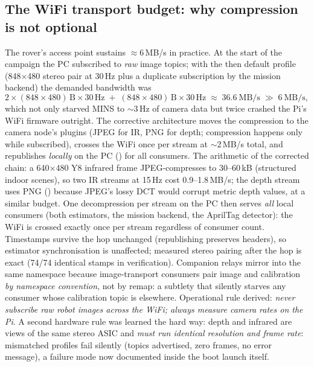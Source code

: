 \subsection{The WiFi transport budget: why compression is not optional}
\label{sec:wifi}
The rover's access point sustains $\approx 6$\,MB/s in practice. At the start
of the campaign the PC subscribed to \emph{raw} image topics; with the then
default profile (848$\times$480 stereo pair at 30\,Hz plus a duplicate
subscription by the mission backend) the demanded bandwidth was
\begin{equation}
2 \times (848{\times}480)\,\text{B} \times 30\,\text{Hz}
\;+\; (848{\times}480)\,\text{B} \times 30\,\text{Hz}
\;\approx\; 36.6\ \text{MB/s} \;\gg\; 6\ \text{MB/s},
\end{equation}
which not only starved MINS to $\sim$3\,Hz of camera data but twice crashed
the Pi's WiFi firmware outright. The corrective architecture moves the
compression to the camera node's  plugins (JPEG for
IR, PNG for depth; compression happens only while subscribed), crosses the
WiFi once per stream at $\sim$2\,MB/s total, and republishes \emph{locally}
on the PC () for all consumers. The arithmetic of the
corrected chain: a 640$\times$480 Y8 infrared frame JPEG-compresses to
30--60\,kB (structured indoor scenes), so two IR streams at 15\,Hz cost
0.9--1.8\,MB/s; the depth stream uses PNG () because
JPEG's lossy DCT would corrupt metric depth values, at a similar budget. One
decompression per stream on the PC then serves \emph{all} local consumers
(both estimators, the mission backend, the AprilTag detector): the WiFi is
crossed exactly once per stream regardless of consumer count. Timestamps
survive the hop unchanged (republishing preserves headers), so estimator
synchronisation is unaffected; measured stereo pairing after the hop is
exact (74/74 identical stamps in verification). Companion relays mirror
 into the same namespace because image-transport consumers
pair image and calibration \emph{by namespace convention}, not by remap:
a subtlety that silently starves any consumer whose calibration topic is
elsewhere. Operational rule derived: \emph{never subscribe raw robot images
across the WiFi; always measure camera rates on the Pi}. A second hardware
rule was learned the hard way: depth and infrared are views of the same
stereo ASIC and \emph{must run identical resolution and frame rate}:
mismatched profiles fail silently (topics advertised, zero frames, no error
message), a failure mode now documented inside the boot launch itself.

